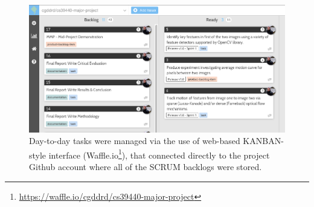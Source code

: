 \begin{figure}[ht!]
\centering
\includegraphics[scale=0.3]{images/kanban.png}
  \caption{Day-to-day tasks were managed via the use of web-based KANBAN-style interface (Waffle.io\footnote{\url{https://waffle.io/cgddrd/cs39440-major-project}}), that connected directly to the project Github account where all of the SCRUM backlogs were stored.}
\label{fig:kanban}
\end{figure}

%
%





